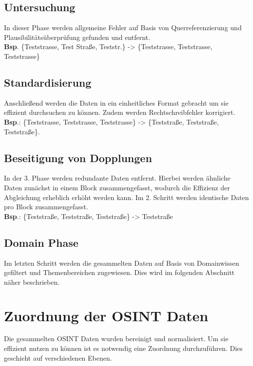 \documentclass[twoside,a4paper]{article}
\begin{document}
\subsection{Untersuchung}
In dieser Phase werden allgemeine Fehler auf Basis von Querreferenzierung und Plausibilitätsüberprüfung gefunden und entfernt. \\
\textbf{Bsp}. \{Teststrasse, Test Straße, Teststr.\} -> \{Teststrasse, Teststrasse, Teststrasse\}

\subsection{Standardisierung}
\label{Standardisierung}
Anschließend werden die Daten in ein einheitliches Format gebracht um sie effizient durchsuchen zu können. Zudem werden Rechtschreibfehler korrigiert. \\
\textbf{Bsp}.: \{Teststrasse, Teststrasse, Teststrasse\} -> \{Teststraße, Teststraße, Teststraße\}.

\subsection{Beseitigung von Dopplungen}
\label{Dopplungen}
In der 3. Phase werden redundante Daten entfernt. Hierbei werden ähnliche Daten zunächst in einem Block zusammengefasst, wodurch die Effizienz der Abgleichung erheblich erhöht werden kann. Im 2. Schritt werden identische Daten pro Block zusammengefasst.\\
\textbf{Bsp}.: \{Teststraße, Teststraße, Teststraße\} -> Teststraße

\subsection{Domain Phase}
Im letzten Schritt werden die gesammelten Daten auf Basis von Domainwissen gefiltert und Themenbereichen zugewiesen. Dies wird im folgenden Abschnitt näher beschrieben.


\section{Zuordnung der OSINT Daten}
Die gesammelten OSINT Daten wurden bereinigt und normalisiert. Um sie effizient nutzen zu können ist es notwendig eine Zuordnung durchzuführen. Dies geschieht auf verschiedenen Ebenen.
\end{document}

